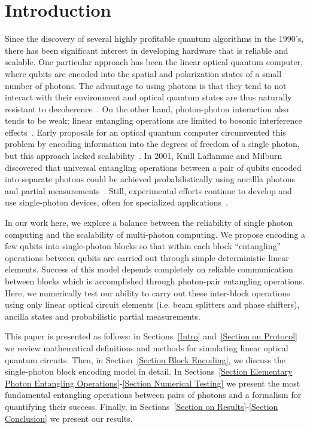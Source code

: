 \documentclass[aps,pra,twocolumn,showpacs,superscriptaddress,floatfix,10pt]{revtex4}
\begin{document}
\section{Introduction}
 Since the discovery of several highly profitable quantum algorithms in the 1990's, there has been significant interest in developing hardware that is reliable and scalable. One particular approach has been the linear optical quantum computer, where qubits are encoded into the spatial and polarization states of a small number of photons. The advantage to using photons is that they tend to not interact with their environment and optical quantum states are thus naturally resistant to decoherence~\cite{Review Paper}. On the other hand, photon-photon interaction also tends to be weak; linear entangling operations are limited to bosonic interference effects~\cite{Review Paper,Hong Ou Mandel}. Early proposals for an optical quantum computer circumvented this problem by encoding information into the degrees of freedom of a single photon, but this approach lacked scalability~\cite{Adami,Torma,Pittman}. In 2001, Knill Laflamme and Milburn discovered that universal entangling operations between a pair of qubits encoded into separate photons could be achieved probabilistically using ancillla photons and partial measurements~\cite{KLM,KLM2}. Still, experimental efforts continue to develop and use single-photon devices, often for specialized applications~\cite{Bao,Starek,Barreiro,Graham,Lanyon, Schreiber, Sansoni,Zadeh}.
 
  In our work here, we explore a balance between the reliability of single photon computing and the scalability of multi-photon computing. We propose encoding a few qubits into single-photon blocks so that within each block ``entangling'' operations between qubits are carried out through simple deterministic linear elements. Success of this model depends completely on reliable communication between blocks which is accomplished through photon-pair entangling operations. Here, we numerically test our ability to carry out these inter-block operations using only linear optical circuit elements  (i.e. beam splitters and phase shifters), ancilla states and probabilistic partial measurements.
  
  This paper is presented as follows: in Sections~\ref{Intro} and~\ref{Section on Protocol} we review mathematical definitions and methods for simulating linear optical quantum circuits. Then, in Section~\ref{Section Block Encoding}, we discuss the single-photon block encoding model in detail. In Sections~\ref{Section Elementary Photon Entangling Operations}-\ref{Section Numerical Testing} we present the most fundamental entangling operations between pairs of photons and a formalism for quantifying their success. Finally, in Sections~\ref{Section on Results}-\ref{Section Conclusion} we present our results.
\end{document}
